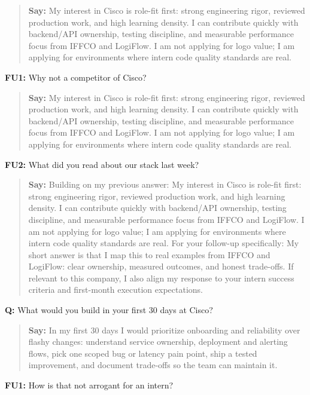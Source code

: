 \documentclass[9pt,a4paper]{article}
\begin{document}
\begin{quote}\small\textbf{Say:} My interest in Cisco is role-fit first: strong engineering rigor, reviewed production work, and high learning density. I can contribute quickly with backend/API ownership, testing discipline, and measurable performance focus from IFFCO and LogiFlow. I am not applying for logo value; I am applying for environments where intern code quality standards are real.\end{quote}
\vspace{2mm}
\textbf{FU1:} Why not a competitor of Cisco?

\begin{quote}\small\textbf{Say:} My interest in Cisco is role-fit first: strong engineering rigor, reviewed production work, and high learning density. I can contribute quickly with backend/API ownership, testing discipline, and measurable performance focus from IFFCO and LogiFlow. I am not applying for logo value; I am applying for environments where intern code quality standards are real.\end{quote}
\vspace{2mm}
\textbf{FU2:} What did you read about our stack last week?

\begin{quote}\small\textbf{Say:} Building on my previous answer: My interest in Cisco is role-fit first: strong engineering rigor, reviewed production work, and high learning density. I can contribute quickly with backend/API ownership, testing discipline, and measurable performance focus from IFFCO and LogiFlow. I am not applying for logo value; I am applying for environments where intern code quality standards are real. For your follow-up specifically: My short answer is that I map this to real examples from IFFCO and LogiFlow: clear ownership, measured outcomes, and honest trade-offs. If relevant to this company, I also align my response to your intern success criteria and first-month execution expectations.\end{quote}
\vspace{2mm}
\textbf{Q:} What would you build in your first 30 days at Cisco?

\begin{quote}\small\textbf{Say:} In my first 30 days I would prioritize onboarding and reliability over flashy changes: understand service ownership, deployment and alerting flows, pick one scoped bug or latency pain point, ship a tested improvement, and document trade-offs so the team can maintain it.\end{quote}
\vspace{2mm}
\textbf{FU1:} How is that not arrogant for an intern?
\end{document}
